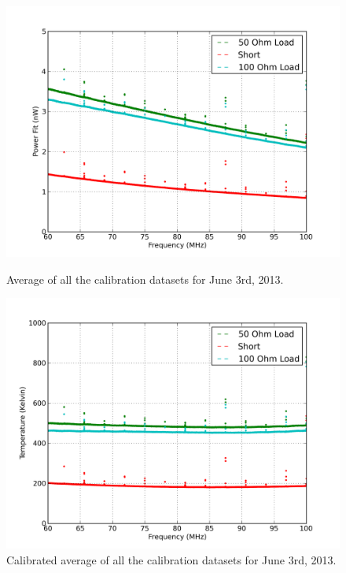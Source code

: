 \begin{figure}[htb]
\centering
\begin{minipage}[b]{0.48\textwidth}
\centering
\includegraphics[width=0.95\linewidth]{Data_analysis/figures/June_03_mean_uncal_ref_spectrum_data.png}
\caption{Average of all the calibration datasets for June 3rd, 2013.}
\label{Fig:avg_cal}
\end{minipage}%
\begin{minipage}[b]{0.02\textwidth}
\hspace{1cm}
\end{minipage}%
\begin{minipage}[b]{0.48\textwidth}
\centering
\includegraphics[width=0.95\linewidth]{Data_analysis/figures/June_03_mean_JNCcal_ref_spectrum_data.png}
\caption{Calibrated average of all the calibration datasets for June 3rd, 2013. }
\label{Fig:avg_cal_data}
\end{minipage}
\end{figure}

